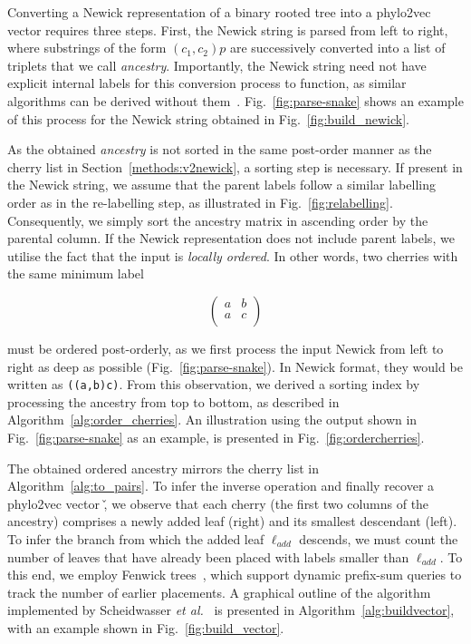 Converting a Newick representation of a binary rooted tree into a phylo2vec vector requires three steps. First, the Newick string is parsed from left to right, where substrings of the form $(c_1, c_2)p$ are successively converted into a list of triplets that we call \emph{ancestry}. Importantly, the Newick string need not have explicit internal labels for this conversion process to function, as similar algorithms can be derived without them~\cite{scheidwasser2025}. Fig.~\ref{fig:parse-snake} shows an example of this process for the Newick string obtained in Fig.~\ref{fig:build_newick}. 



As the obtained \emph{ancestry} is not sorted in the same post-order manner as the cherry list in Section~\ref{methods:v2newick}, a sorting step is necessary. If present in the Newick string, we assume that the parent labels follow a similar labelling order as in the re-labelling step, as illustrated in Fig.~\ref{fig:relabelling}. Consequently, we simply sort the ancestry matrix in ascending order by the parental column. If the Newick representation does not include parent labels, we utilise the fact that the input is \emph{locally ordered}. In other words, two cherries with the same minimum label 

\begin{equation*}
    \begin{pmatrix}
        a & b \\
        a & c \\
    \end{pmatrix}
\end{equation*}

must be ordered post-orderly, as we first process the input Newick from left to right as deep as possible (Fig.~\ref{fig:parse-snake}). In Newick format, they would be written as \texttt{((a,b)c)}. From this observation, we derived a sorting index by processing the ancestry from top to bottom, as described in Algorithm~\ref{alg:order_cherries}. An illustration using the output shown in Fig.~\ref{fig:parse-snake} as an example, is presented in Fig.~\ref{fig:ordercherries}.





The obtained ordered ancestry mirrors the cherry list in Algorithm~\ref{alg:to_pairs}. To infer the inverse operation and finally recover a phylo2vec vector \v, we observe that each cherry (the first two columns of the ancestry) comprises a newly added leaf (right) and its smallest descendant (left). To infer the branch from which the added leaf $\ell_{add}$ descends, we must count the number of leaves that have already been placed with labels smaller than $\ell_{add}$. To this end, we employ Fenwick trees~\cite{ryabko1992, fenwick1994}, which support dynamic prefix-sum queries to track the number of earlier placements. A graphical outline of the algorithm implemented by Scheidwasser \textit{et al.}~\cite{scheidwasser2025} is presented in Algorithm~\ref{alg:buildvector}, with an example shown in Fig.~\ref{fig:build_vector}.

